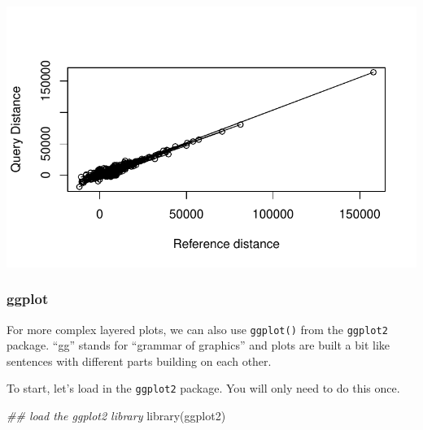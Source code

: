 \documentclass[
  letterpaper,
  DIV=11,
  numbers=noendperiod]{scrreprt}
\newenvironment{Shaded}{\begin{snugshade}}{\end{snugshade}}
\newcommand{\AttributeTok}[1]{\textcolor[rgb]{0.40,0.45,0.13}{#1}}
\newcommand{\DocumentationTok}[1]{\textcolor[rgb]{0.37,0.37,0.37}{\textit{#1}}}
\newcommand{\FunctionTok}[1]{\textcolor[rgb]{0.28,0.35,0.67}{#1}}
\newcommand{\NormalTok}[1]{\textcolor[rgb]{0.00,0.23,0.31}{#1}}
\newcommand{\SpecialCharTok}[1]{\textcolor[rgb]{0.37,0.37,0.37}{#1}}
\newcommand{\StringTok}[1]{\textcolor[rgb]{0.13,0.47,0.30}{#1}}
\begin{document}
\begin{Shaded}
\end{Shaded}

\includegraphics{scripts/02_dataViz/class3_files/figure-pdf/unnamed-chunk-5-1.pdf}

\subsubsection{ggplot}\label{ggplot}

For more complex layered plots, we can also use \texttt{ggplot()} from
the \texttt{ggplot2} package. ``gg'' stands for ``grammar of graphics''
and plots are built a bit like sentences with different parts building
on each other.

To start, let's load in the \texttt{ggplot2} package. You will only need
to do this once.

\begin{Shaded}
\begin{Highlighting}[]
\DocumentationTok{\#\# load the ggplot2 library}
\FunctionTok{library}\NormalTok{(ggplot2)}
\end{Highlighting}
\end{Shaded}
\end{document}
